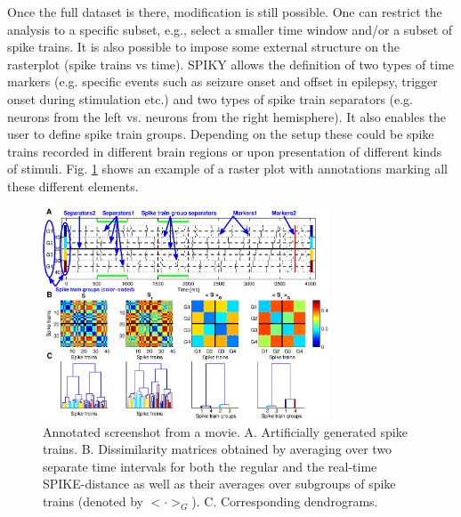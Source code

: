 \documentclass[10pt,twocolumn]{elsart5p}
\begin{document}
Once the full dataset is there, modification is still possible. One can restrict the analysis to a specific subset, e.g., select a smaller time window and/or a subset of spike trains. It is also possible to impose some external structure on the rasterplot (spike trains vs time). SPIKY allows the definition of two types of time markers (e.g. specific events such as seizure onset and offset in epilepsy, trigger onset during stimulation etc.) and two types of spike train separators (e.g. neurons from the left vs. neurons from the right hemisphere). It also enables the user to define spike train groups. Depending on the setup these could be spike trains recorded in different brain regions or upon presentation of different kinds of stimuli. Fig. \ref{fig:Movie-Screenshot} shows an example of a raster plot with annotations marking all these different elements.
%
%
\begin{figure}
    \includegraphics[width=85mm]{Movie_Screenshot.eps}
    \caption{\abb\label{fig:Movie-Screenshot} Annotated screenshot from a movie.   A. Artificially generated spike trains.   B. Dissimilarity matrices obtained by averaging over two separate time intervals for both the regular and the real-time SPIKE-distance as well as their averages over subgroups of spike trains (denoted by $<\cdot>_G$).   C. Corresponding dendrograms.}
\end{figure}
%
\end{document}
